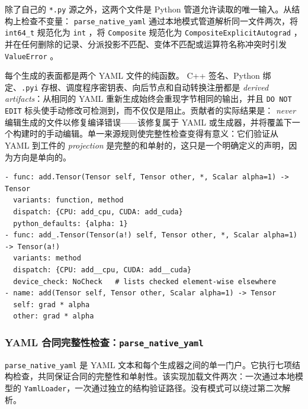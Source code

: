 除了自己的 \texttt{*.py} 源之外，这两个文件是 Python 管道允许读取的唯一输入。从结构上检查不变量： \texttt{parse\_native\_yaml} 通过本地模式管道解析同一文件两次，将 \texttt{int64\_t} 规范化为 \texttt{int} ，将 \texttt{Composite} 规范化为 \texttt{CompositeExplicitAutograd} ，并在任何删除的记录、分派投影不匹配、变体不匹配或运算符名称冲突时引发 \texttt{ValueError} 。

\begin{tpnote}
每个生成的表面都是两个 YAML 文件的纯函数。 C++ 签名、Python 绑定、\texttt{.pyi} 存根、调度程序密钥表、向后节点和自动转换注册都是 \emph{derived artifacts}：从相同的 YAML 重新生成始终会重现字节相同的输出，并且 \texttt{DO NOT EDIT} 标头使手动修改可检测到，而不仅仅是阻止。贡献者的实际结果是： \emph{never} 编辑生成的文件以修复编译错误——该修复属于 YAML 或生成器，并将覆盖下一个构建时的手动编辑。单一来源规则使完整性检查变得有意义：它们验证从 YAML 到工件的 \emph{projection} 是完整的和单射的，这只是一个明确定义的声明，因为方向是单向的。
\end{tpnote}

\begin{lstlisting}[caption={and fragments.}, label=lst:yamlfrag, style=pystyle]
- func: add.Tensor(Tensor self, Tensor other, *, Scalar alpha=1) -> Tensor
  variants: function, method
  dispatch: {CPU: add_cpu, CUDA: add_cuda}
  python_defaults: {alpha: 1}
- func: add_.Tensor(Tensor(a!) self, Tensor other, *, Scalar alpha=1) -> Tensor(a!)
  variants: method
  dispatch: {CPU: add__cpu, CUDA: add__cuda}
  device_check: NoCheck   # lists checked element-wise elsewhere
- name: add(Tensor self, Tensor other, Scalar alpha=1) -> Tensor
  self: grad * alpha
  other: grad * alpha
\end{lstlisting}

\subsubsection{YAML 合同完整性检查：\texttt{parse\_native\_yaml}}

\texttt{parse\_native\_yaml} 是 YAML 文本和每个生成器之间的单一门户。它执行七项结构检查，共同保证合同的完整性和单射性。该实现加载文件两次：一次通过本地模型的 \texttt{YamlLoader}，一次通过独立的结构验证路径。没有模式可以绕过第二次解析。

